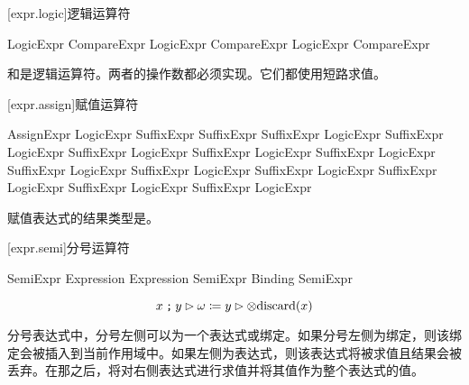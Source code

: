 [expr.logic]{逻辑运算符}

\begin{bnf}{LogicExpr}
    CompareExpr \br
    LogicExpr \terminal{\&} CompareExpr \br
    LogicExpr \terminal{|} CompareExpr
\end{bnf}

\pnum
\tcode{\&}和\tcode{|}是逻辑运算符。两者的操作数都必须实现。它们都使用短路求值。

[expr.assign]{赋值运算符}

\begin{bnf}{AssignExpr}
    LogicExpr \br
    SuffixExpr \terminal{++} \br
    SuffixExpr \terminal{--} \br
    SuffixExpr \terminal{=} LogicExpr \br
    SuffixExpr \terminal{+=} LogicExpr \br
    SuffixExpr \terminal{-=} LogicExpr \br
    SuffixExpr \terminal{*=} LogicExpr \br
    SuffixExpr \terminal{/=} LogicExpr \br
    SuffixExpr  LogicExpr \br
    SuffixExpr  LogicExpr \br
    SuffixExpr \terminal{\%=} LogicExpr \br
    SuffixExpr  LogicExpr \br
    SuffixExpr  LogicExpr \br
    SuffixExpr  LogicExpr
\end{bnf}

\pnum
赋值表达式的结果类型是。

[expr.semi]{分号运算符}

\begin{bnf}{SemiExpr}
    Expression \br
    Expression \terminal{;} SemiExpr\br
    Binding \terminal{;} SemiExpr
\end{bnf}

$$ x \mathbin{\texttt{;}} y \rhd \omega \coloneqq y \rhd \otimes \mathrm{discard}(x)$$

\pnum
分号表达式中，分号左侧可以为一个表达式或绑定。如果分号左侧为绑定，则该绑定会被插入到当前作用域中。如果左侧为表达式，则该表达式将被求值且结果会被丢弃。在那之后，将对右侧表达式进行求值并将其值作为整个表达式的值。
